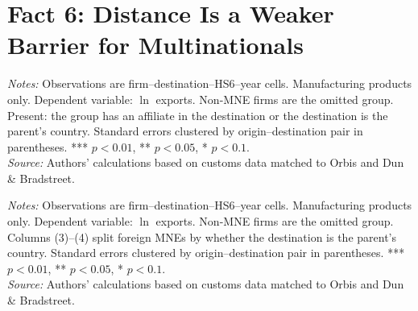 \documentclass[11pt,a4paper]{article}
\begin{document}
\section{Fact 6: Distance Is a Weaker Barrier for Multinationals}\label{sec:f6_manufacturing}
\begin{table}[H]\centering\small%
  \caption{Manufacturing: Distance and Firm Exports: Multinationals by Presence at the Destination}%
  \label{tab:t2_manufacturing}%
  \par\vspace{3pt}%
  \begin{minipage}{0.95\textwidth}\footnotesize %
  \textit{Notes:} Observations are firm--destination--HS6--year cells. Manufacturing products only. Dependent variable: $\ln$ exports. Non-MNE firms are the omitted group. Present: the group has an affiliate in the destination or the destination is the parent's country. Standard errors clustered by origin--destination pair in parentheses. *** $p<0.01$, ** $p<0.05$, * $p<0.1$.\\[3pt]%
  \textit{Source:} Authors' calculations based on customs data matched to Orbis and Dun \& Bradstreet.%
  \end{minipage}%
  \end{table}
\begin{table}[H]\centering\small%
  \caption{Manufacturing: Distance and Firm Exports: Foreign and Domestic Multinationals}%
  \label{tab:dist_manufacturing}%
  \par\vspace{3pt}%
  \begin{minipage}{0.95\textwidth}\footnotesize %
  \textit{Notes:} Observations are firm--destination--HS6--year cells. Manufacturing products only. Dependent variable: $\ln$ exports. Non-MNE firms are the omitted group. Columns (3)--(4) split foreign MNEs by whether the destination is the parent's country. Standard errors clustered by origin--destination pair in parentheses. *** $p<0.01$, ** $p<0.05$, * $p<0.1$.\\[3pt]%
  \textit{Source:} Authors' calculations based on customs data matched to Orbis and Dun \& Bradstreet.%
  \end{minipage}%
  \end{table}
\end{document}
